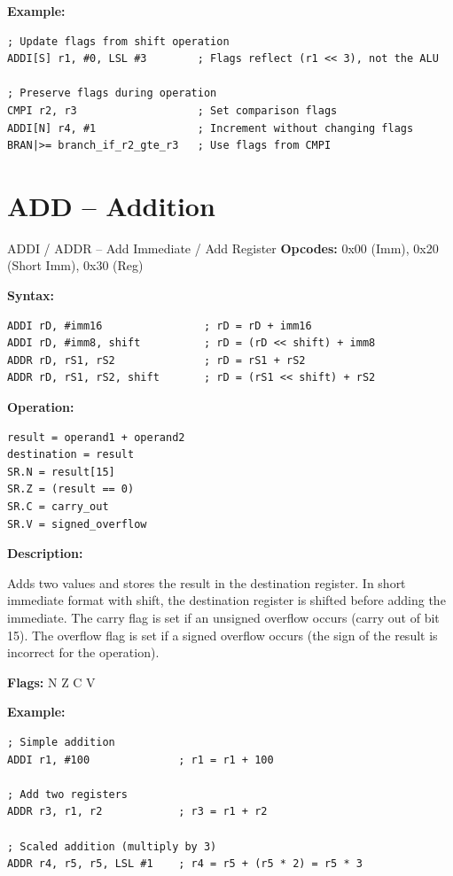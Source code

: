 \textbf{Example:}
\begin{lstlisting}
; Update flags from shift operation
ADDI[S] r1, #0, LSL #3        ; Flags reflect (r1 << 3), not the ALU

; Preserve flags during operation
CMPI r2, r3                   ; Set comparison flags
ADDI[N] r4, #1                ; Increment without changing flags
BRAN|>= branch_if_r2_gte_r3   ; Use flags from CMPI
\end{lstlisting}

\section{ADD -- Addition}

\begin{instructionbox}{ADDI / ADDR -- Add Immediate / Add Register}
	\textbf{Opcodes:} 0x00 (Imm), 0x20 (Short Imm), 0x30 (Reg)

	\textbf{Syntax:}
	\begin{lstlisting}
ADDI rD, #imm16                ; rD = rD + imm16
ADDI rD, #imm8, shift          ; rD = (rD << shift) + imm8
ADDR rD, rS1, rS2              ; rD = rS1 + rS2
ADDR rD, rS1, rS2, shift       ; rD = (rS1 << shift) + rS2
\end{lstlisting}

	\textbf{Operation:}
	\begin{verbatim}
result = operand1 + operand2
destination = result
SR.N = result[15]
SR.Z = (result == 0)
SR.C = carry_out
SR.V = signed_overflow
\end{verbatim}

	\textbf{Description:}

	Adds two values and stores the result in the destination register. In short immediate format with shift, the
	destination register is shifted before adding the immediate. The carry flag is set if an unsigned overflow occurs
	(carry out of bit 15). The overflow flag is set if a signed overflow occurs (the sign of the result is incorrect for
	the operation).

	\textbf{Flags:} N Z C V

	\textbf{Example:}
	\begin{lstlisting}
; Simple addition
ADDI r1, #100              ; r1 = r1 + 100

; Add two registers
ADDR r3, r1, r2            ; r3 = r1 + r2

; Scaled addition (multiply by 3)
ADDR r4, r5, r5, LSL #1    ; r4 = r5 + (r5 * 2) = r5 * 3


\end{lstlisting}
\end{instructionbox}
